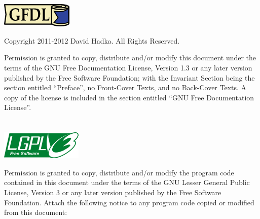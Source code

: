 \chapter*{}

\begin{center}
\includegraphics{gfdl.png}
\end{center}

\vspace{1em}
\noindent
Copyright 2011-2012 David Hadka.  All Rights Reserved.

\vspace{1em}
\noindent
Permission is granted to copy, distribute and/or modify this document under the terms of the GNU Free Documentation License, Version 1.3 or any later version published by the Free Software Foundation; with the Invariant Section being the section entitled ``Preface'', no Front-Cover Texts, and no Back-Cover Texts.  A copy of the license is included in the section entitled ``GNU Free Documentation License''.

\chapter*{}

\begin{center}
\includegraphics{lgpl.png}
\end{center}

\vspace{1em}
\noindent
Permission is granted to copy, distribute and/or modify the program code contained in this document under the terms of the GNU Lesser General Public License, Version 3 or any later version published by the Free Software Foundation.  Attach the following notice to any program code copied or modified from this document:


